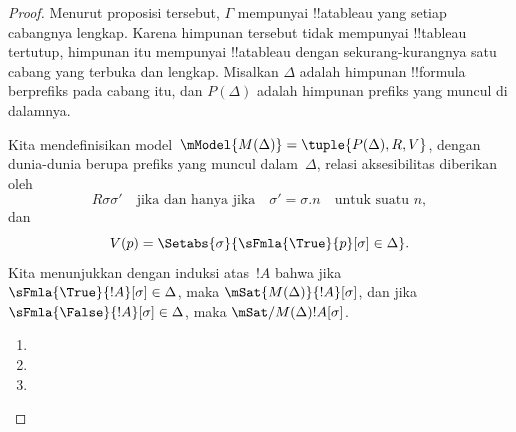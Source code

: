 \documentclass[../../../include/open-logic-section]{subfiles}
\begin{document}
\begin{proof}
Menurut proposisi tersebut, $\Gamma$ mempunyai !!a{tableau} yang setiap
cabangnya lengkap. Karena himpunan tersebut tidak mempunyai !!{tableau}
tertutup, himpunan itu mempunyai !!a{tableau} dengan sekurang-kurangnya satu
cabang yang terbuka dan lengkap. Misalkan $\Delta$ adalah himpunan
!!{formula} berprefiks pada cabang
itu, dan $P(\Delta)$ adalah himpunan prefiks yang muncul di dalamnya.

Kita mendefinisikan model~$\mModel{M(\Delta)} = \tuple{P(\Delta), R, V}$,
dengan dunia-dunia berupa prefiks yang muncul dalam~$\Delta$, relasi
aksesibilitas diberikan oleh
\[
R\sigma\sigma' \quad \text{jika dan hanya jika} \quad
\sigma'=\sigma.n \quad \text{untuk suatu~$n$},
\]
dan
\[
V(p) = \Setabs{\sigma}{\sFmla{\True}{p}[\sigma] \in \Delta}.
\]
Kita menunjukkan dengan induksi atas~$!A$ bahwa jika
$\sFmla{\True}{!A}[\sigma] \in \Delta$, maka
$\mSat{M(\Delta)}{!A}[\sigma]$, dan jika
$\sFmla{\False}{!A}[\sigma] \in \Delta$, maka
$\mSat/{M(\Delta)}{!A}[\sigma]$.

\begin{enumerate}
  \item {}
  \item {}
  \item {}
\end{enumerate}
\end{proof}
\end{document}
